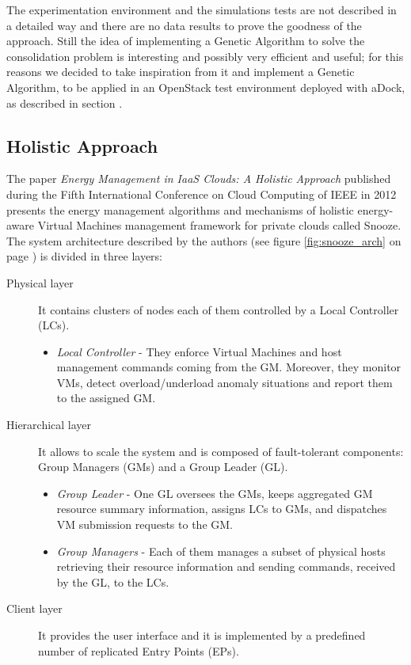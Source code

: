 The experimentation environment and the simulations tests are not described in a detailed way and there are no data results to prove the goodness of the approach. Still the idea of implementing a Genetic Algorithm to solve the consolidation problem is interesting and possibly very efficient and useful; for this reasons we decided to take inspiration from it and implement a Genetic Algorithm, to be applied in an OpenStack test environment deployed with aDock, as described in section .

\subsection{Holistic Approach}
\label{sec:sota_holistic}
The paper \textit{Energy Management in IaaS Clouds: A Holistic Approach} published during the Fifth International Conference on Cloud Computing of IEEE in 2012 presents the energy management algorithms and mechanisms of  holistic energy-aware Virtual Machines management framework for private clouds called Snooze.\\
The system architecture described by the authors (see figure \ref{fig:snooze_arch} on page \pageref{fig:snooze_arch}) is divided in three layers:
\begin{description}
  \item[Physical layer] It contains clusters of nodes each of them controlled by a Local Controller (LCs).
    \begin{itemize}
      \item \textit{Local Controller} - They enforce Virtual Machines and host management commands coming from the GM. Moreover, they monitor VMs, detect overload/underload anomaly situations and report them to the assigned GM.
    \end{itemize}
  \item[Hierarchical layer] It allows to scale the system and is composed of fault-tolerant components: Group Managers (GMs) and a Group Leader (GL).
      \begin{itemize}
      \item \textit{Group Leader} - One GL oversees the GMs, keeps aggregated GM resource summary information, assigns LCs to GMs, and dispatches VM submission requests to the GM.
      \item \textit{Group Managers} - Each of them manages a subset of physical hosts retrieving their resource information and sending commands, received by the GL, to the LCs.
      \end{itemize}
  \item[Client layer] It provides the user interface and it is implemented by a predefined number of replicated Entry Points (EPs).
\end{description}

